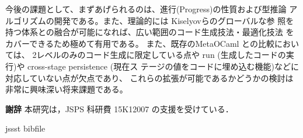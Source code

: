 \documentclass[T]{compsoft}
\theoremstyle{break}
\begin{document}
今後の課題として、まずあげられるのは、進行(Progress)の性質および型推論
アルゴリズムの開発である。また、理論的には Kiselyovらのグローバルな参
照を持つ体系との融合が可能になれば、広い範囲のコード生成技法・最適化技法
をカバーできるため極めて有用である。
また、既存のMetaOCaml との比較においては、
2レベルのみのコード生成に限定している点や 
run (生成したコードの実行)や cross-stage persistence (現在ス
テージの値をコードに埋め込む機能)などに対応していない点が欠点であり、
これらの拡張が可能であるかどうかの検討は非常に興味深い将来課題である。

{\bf 謝辞} 本研究は，JSPS 科研費 15K12007 の支援を受けている．

 {jssst}
 {bibfile}
\end{document}
